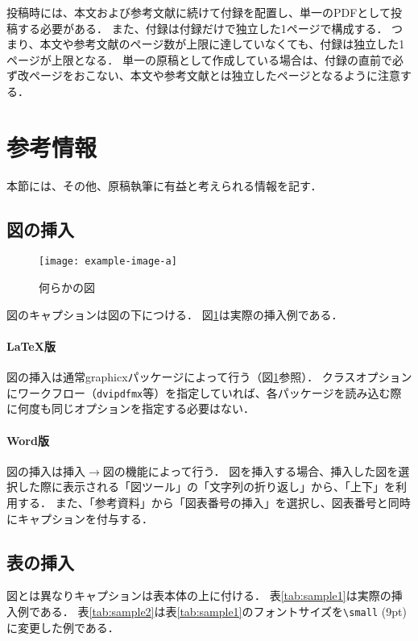 \documentclass[
  platex, dvipdfmx,  %
]{nlp2021}
\newcommand{\pkg}[1]{\textsf{#1}}
\newcommand{\code}[1]{\texttt{#1}}
\begin{document}
投稿時には、本文および参考文献に続けて付録を配置し、単一のPDFとして投稿する必要がある．
また、付録は付録だけで独立した1ページで構成する．
つまり、本文や参考文献のページ数が上限に達していなくても、付録は独立した1ページが上限となる．
単一の原稿として作成している場合は、付録の直前で必ず改ページをおこない、本文や参考文献とは独立したページとなるように注意する．







\section{参考情報}
本節には、その他、原稿執筆に有益と考えられる情報を記す．

\subsection{図の挿入}
%
\begin{figure}[t]
\centering
\texttt{[image: example-image-a]}
\caption{何らかの図}
\label{fig:sample}
\end{figure}

図のキャプションは図の下につける．
図\ref{fig:sample}は実際の挿入例である．


\paragraph{LaTeX版}
図の挿入は通常\pkg{graphicx}パッケージによって行う（図\ref{fig:sample}参照）．
クラスオプションにワークフロー（\code{dvipdfmx}等）を指定していれば、各パッケージを読み込む際に何度も同じオプションを指定する必要はない．


\paragraph{Word版}
図の挿入は挿入$\xrightarrow{}$図の機能によって行う．
図を挿入する場合、挿入した図を選択した際に表示される「図ツール」の「文字列の折り返し」から、「上下」を利用する．
また、「参考資料」から「図表番号の挿入」を選択し、図表番号と同時にキャプションを付与する．



\subsection{表の挿入}
図とは異なりキャプションは表本体の上に付ける．
表\ref{tab:sample1}は実際の挿入例である．
表\ref{tab:sample2}は表\ref{tab:sample1}のフォントサイズを\verb|\small| (9pt)に変更した例である．
\end{document}
